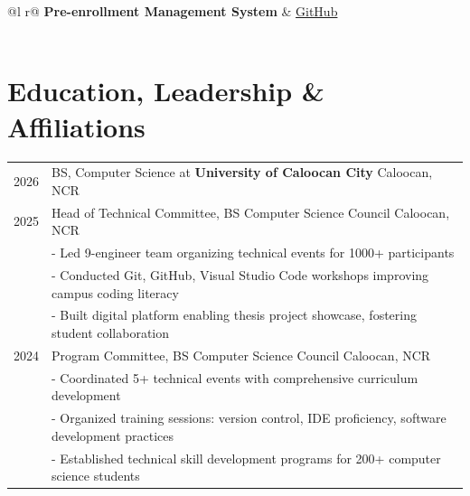 \documentclass[a4paper,12pt]{article}
\begin{document}
\begin{tabularx}{\linewidth}{ @{}l r@{} }
\textbf{Pre-enrollment Management System} & \hfill \href{https://github.com/PP-Namias/Pre-enrollment-Management-System}{GitHub} \\[3.75pt]
 \\
\end{tabularx}

\section{Education, Leadership \& Affiliations}

\begin{tabularx}{\linewidth}{@{}l X@{}}	

2026 & BS, Computer Science at \textbf{University of Caloocan City} \hfill Caloocan, NCR \\

2025 & Head of Technical Committee, BS Computer Science Council \hfill Caloocan, NCR \\
& - Led 9-engineer team organizing technical events for 1000+ participants \\
& - Conducted Git, GitHub, Visual Studio Code workshops improving campus coding literacy \\
& - Built digital platform enabling thesis project showcase, fostering student collaboration \\

2024 & Program Committee, BS Computer Science Council \hfill Caloocan, NCR \\
& - Coordinated 5+ technical events with comprehensive curriculum development \\
& - Organized training sessions: version control, IDE proficiency, software development practices \\
& - Established technical skill development programs for 200+ computer science students \\

\end{tabularx}
\end{document}
